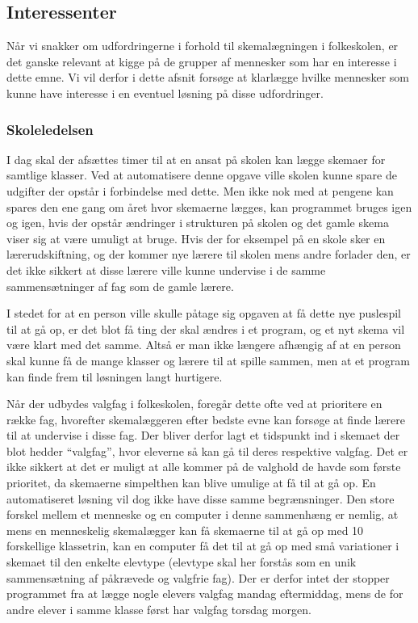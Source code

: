 \subsection{Interessenter}
Når vi snakker om udfordringerne i forhold til skemalægningen i folkeskolen, er det ganske relevant at kigge på de grupper af mennesker som har en interesse i dette emne. Vi vil derfor i dette afsnit forsøge at klarlægge hvilke mennesker som kunne have interesse i en eventuel løsning på disse udfordringer.

\subsubsection{Skoleledelsen}
I dag skal der afsættes timer til at en ansat på skolen kan lægge skemaer for samtlige klasser. Ved at automatisere denne opgave ville skolen kunne spare de udgifter der opstår i forbindelse med dette. Men ikke nok med at pengene kan spares den ene gang om året hvor skemaerne lægges, kan programmet bruges igen og igen, hvis der opstår ændringer i strukturen på skolen og det gamle skema viser sig at være umuligt at bruge. Hvis der for eksempel på en skole sker en lærerudskiftning, og der kommer nye lærere til skolen mens andre forlader den, er det ikke sikkert at disse lærere ville kunne undervise i de samme sammensætninger af fag som de gamle lærere. 

I stedet for at en person ville skulle påtage sig opgaven at få dette nye puslespil til at gå op, er det blot få ting der skal ændres i et program, og et nyt skema vil være klart med det samme. Altså er man ikke længere afhængig af at en person skal kunne få de mange klasser og lærere til at spille sammen, men at et program kan finde frem til løsningen langt hurtigere. 

Når der udbydes valgfag i folkeskolen, foregår dette ofte ved at prioritere en række fag, hvorefter skemalæggeren efter bedste evne kan forsøge at finde lærere til at undervise i disse fag. Der bliver derfor lagt et tidspunkt ind i skemaet der blot hedder ``valgfag'', hvor eleverne så kan gå til deres respektive valgfag. Det er ikke sikkert at det er muligt at alle kommer på de valghold de havde som første prioritet, da skemaerne simpelthen kan blive umulige at få til at gå op. En automatiseret løsning vil dog ikke have disse samme begrænsninger. Den store forskel mellem et menneske og en computer i denne sammenhæng er nemlig, at mens en menneskelig skemalægger kan få skemaerne til at gå op med 10 forskellige klassetrin, kan en computer få det til at gå op med små variationer i skemaet til den enkelte elevtype (elevtype skal her forstås som en unik sammensætning af påkrævede og valgfrie fag). Der er derfor intet der stopper programmet fra at lægge nogle elevers valgfag mandag eftermiddag, mens de for andre elever i samme klasse først har valgfag torsdag morgen.

